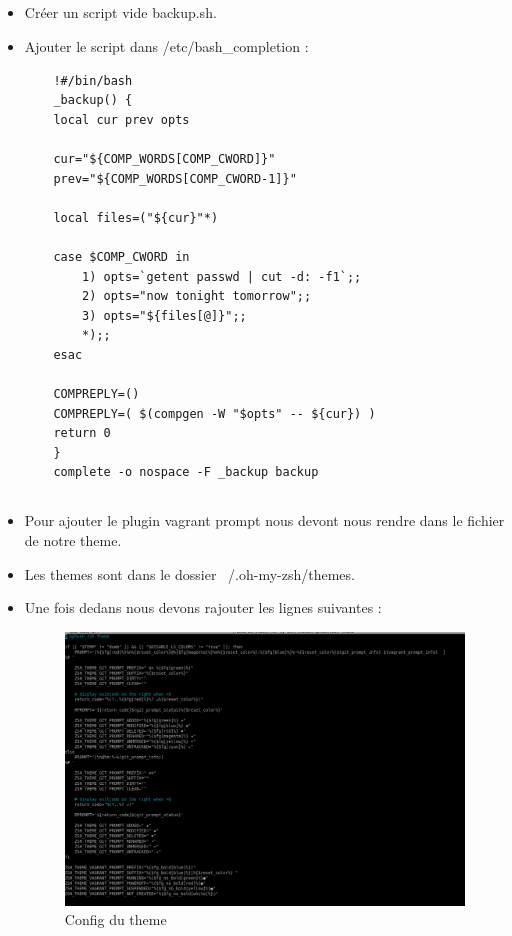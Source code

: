 \documentclass{article}
\begin{document}
\subsection{}
\begin{itemize}
    \item Créer un script vide backup.sh.
    \item Ajouter le script dans /etc/bash\_completion :
    \begin{lstlisting}
    !#/bin/bash
    _backup() {
    local cur prev opts

    cur="${COMP_WORDS[COMP_CWORD]}"
    prev="${COMP_WORDS[COMP_CWORD-1]}"

    local files=("${cur}"*)

    case $COMP_CWORD in
        1) opts=`getent passwd | cut -d: -f1`;;
        2) opts="now tonight tomorrow";;
        3) opts="${files[@]}";;
        *);;
    esac

    COMPREPLY=()
    COMPREPLY=( $(compgen -W "$opts" -- ${cur}) )
    return 0
    }
    complete -o nospace -F _backup backup
    \end{lstlisting}
\end{itemize}

\subsection{}

\begin{itemize}
\item Pour ajouter le plugin vagrant prompt nous devont nous rendre dans le fichier de notre theme.
\item Les themes sont dans le dossier ~/.oh-my-zsh/themes.
\item Une fois dedans nous devons rajouter les lignes suivantes :

\begin{figure}[h]
    \centering
    \includegraphics[width=0.7\columnwidth]{screen/1_7.png}
    \caption{\label{fig:frog}Config du theme}
    \end{figure}

\end{itemize}
\end{document}
